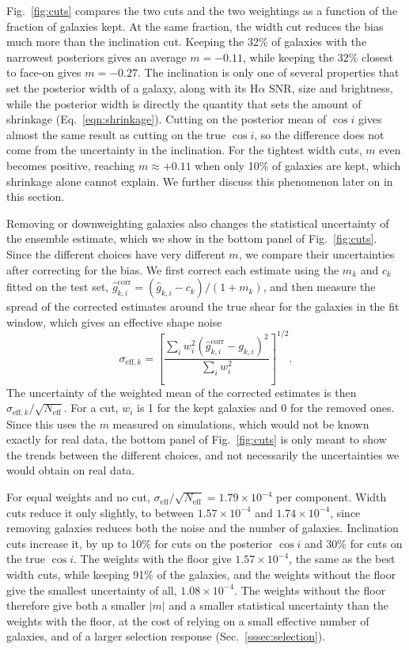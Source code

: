 Fig.~\ref{fig:cuts} compares the two cuts and the two weightings as a function of the fraction of galaxies kept. At the same fraction, the width cut reduces the bias much more than the inclination cut. Keeping the 32\% of galaxies with the narrowest posteriors gives an average $m = -0.11$, while keeping the 32\% closest to face-on gives $m = -0.27$. The inclination is only one of several properties that set the posterior width of a galaxy, along with its H$\alpha$ SNR, size and brightness, while the posterior width is directly the quantity that sets the amount of shrinkage (Eq.~\ref{eqn:shrinkage}). Cutting on the posterior mean of $\cos i$ gives almost the same result as cutting on the true $\cos i$, so the difference does not come from the uncertainty in the inclination. For the tightest width cuts, $m$ even becomes positive, reaching $m \approx +0.11$ when only 10\% of galaxies are kept, which shrinkage alone cannot explain. We further discuss this phenomenon later on in this section.

Removing or downweighting galaxies also changes the statistical uncertainty of the ensemble estimate, which we show in the bottom panel of Fig.~\ref{fig:cuts}. Since the different choices have very different $m$, we compare their uncertainties after correcting for the bias. We first correct each estimate using the $m_k$ and $c_k$ fitted on the test set, $\hat{g}^\mathrm{corr}_{k,i} = (\hat{g}_{k,i} - c_k)/(1+m_k)$, and then measure the spread of the corrected estimates around the true shear for the galaxies in the fit window, which gives an effective shape noise
\begin{equation}
\label{eqn:sigma-eff}
    \sigma_{\mathrm{eff},k} = \left[\frac{\sum_i w_i^2 \left(\hat{g}^\mathrm{corr}_{k,i} - g_{k,i}\right)^2}{\sum_i w_i^2}\right]^{1/2}.
\end{equation}
The uncertainty of the weighted mean of the corrected estimates is then $\sigma_{\mathrm{eff},k}/\sqrt{N_\mathrm{eff}}$. For a cut, $w_i$ is 1 for the kept galaxies and 0 for the removed ones. Since this uses the $m$ measured on simulations, which would not be known exactly for real data, the bottom panel of Fig.~\ref{fig:cuts} is only meant to show the trends between the different choices, and not necessarily the uncertainties we would obtain on real data.

For equal weights and no cut, $\sigma_\mathrm{eff}/\sqrt{N_\mathrm{eff}} = 1.79\times10^{-4}$ per component. Width cuts reduce it only slightly, to between $1.57\times10^{-4}$ and $1.74\times10^{-4}$, since removing galaxies reduces both the noise and the number of galaxies. Inclination cuts increase it, by up to 10\% for cuts on the posterior $\cos i$ and 30\% for cuts on the true $\cos i$. The weights with the floor give $1.57\times10^{-4}$, the same as the best width cuts, while keeping 91\% of the galaxies, and the weights without the floor give the smallest uncertainty of all, $1.08\times10^{-4}$. The weights without the floor therefore give both a smaller $|m|$ and a smaller statistical uncertainty than the weights with the floor, at the cost of relying on a small effective number of galaxies, and of a larger selection response (Sec.~\ref{sssec:selection}).

